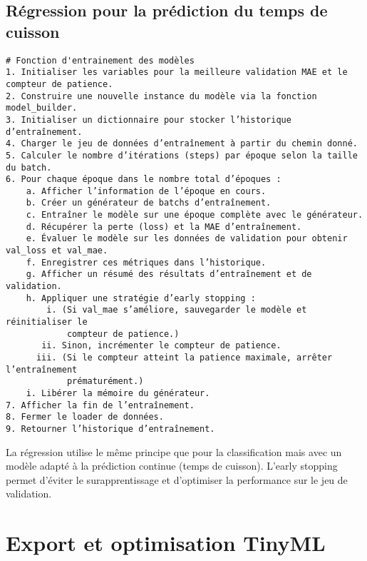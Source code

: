 \subsection{Régression pour la prédiction du temps de cuisson}
{\small
	\begin{verbatim}
# Fonction d'entrainement des modèles 
1. Initialiser les variables pour la meilleure validation MAE et le compteur de patience.
2. Construire une nouvelle instance du modèle via la fonction model_builder.
3. Initialiser un dictionnaire pour stocker l’historique d’entraînement.
4. Charger le jeu de données d’entraînement à partir du chemin donné.
5. Calculer le nombre d’itérations (steps) par époque selon la taille du batch.
6. Pour chaque époque dans le nombre total d’époques :
    a. Afficher l’information de l’époque en cours.
    b. Créer un générateur de batchs d’entraînement.
    c. Entraîner le modèle sur une époque complète avec le générateur.
    d. Récupérer la perte (loss) et la MAE d’entraînement.
    e. Évaluer le modèle sur les données de validation pour obtenir val_loss et val_mae.
    f. Enregistrer ces métriques dans l’historique.
    g. Afficher un résumé des résultats d’entraînement et de validation.
    h. Appliquer une stratégie d’early stopping :
        i. (Si val_mae s’améliore, sauvegarder le modèle et réinitialiser le 
            compteur de patience.)
       ii. Sinon, incrémenter le compteur de patience.
      iii. (Si le compteur atteint la patience maximale, arrêter l’entraînement 
            prématurément.)
    i. Libérer la mémoire du générateur.
7. Afficher la fin de l’entraînement.
8. Fermer le loader de données.
9. Retourner l’historique d’entraînement.
\end{verbatim}}

La régression utilise le même principe que pour la classification mais avec un modèle adapté à la prédiction continue (temps de cuisson). L’early stopping permet d’éviter le surapprentissage et d’optimiser la performance sur le jeu de validation.

\section{Export et optimisation TinyML}
\label{sec:optim_tinyml}

